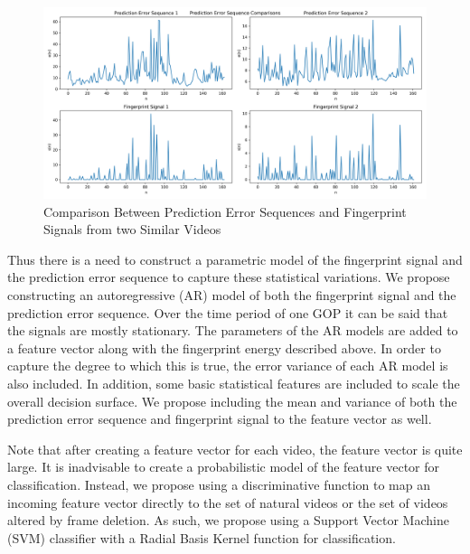 \begin{figure}[htbp]
\centerline{\includegraphics[width=0.9\linewidth]{ProposedApproach/perror_seq_comparisons.png}}
\caption{Comparison Between Prediction Error Sequences and Fingerprint Signals from two Similar Videos}
\label{seqCompare}
\end{figure}

Thus there is a need to construct a parametric model of the fingerprint signal and the prediction error sequence to capture these statistical variations. We propose constructing an autoregressive (AR) model of both the fingerprint signal and the prediction error sequence. Over the time period of one GOP it can be said that the signals are mostly stationary. The parameters of the AR models are added to a feature vector along with the fingerprint energy described above. In order to capture the degree to which this is true, the error variance of each AR model is also included. In addition, some basic statistical features are included to scale the overall decision surface. We propose including the mean and variance of both the prediction error sequence and fingerprint signal to the feature vector as well.

Note that after creating a feature vector for each video, the feature vector is quite large. It is inadvisable to create a probabilistic model of the feature vector for classification. Instead, we propose using a discriminative function to map an incoming feature vector directly to the set of natural videos or the set of videos altered by frame deletion. As such, we propose using a Support Vector Machine (SVM) classifier with a Radial Basis Kernel function for classification.